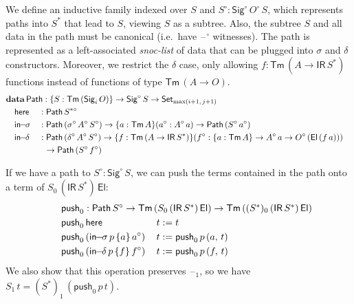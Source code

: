 \documentclass[acmsmall,screen,review,anonymous]{acmart}
\newcommand{\msf}[1]{{\mathsf{#1}}}
\newcommand{\mbf}[1]{{\mathbf{#1}}}
\newcommand{\push}{\mathsf{push}}
\newcommand{\data}{\mbf{data}}
\newcommand{\Set}{\msf{Set}}
\newcommand{\El}{\msf{El}}
\newcommand{\Sig}{\msf{Sig}}
\newcommand{\blank}{{\mathord{\hspace{1pt}\text{--}\hspace{1pt}}}}
\newcommand{\IR}{\msf{IR}}
\newcommand{\Tm}{\msf{Tm}}
\newcommand{\w}{\circ}
\newcommand{\Path}{\msf{Path}}
\newcommand{\here}{\msf{here}}
\newcommand{\Ssw}{S^{*\w}}
\newcommand{\insigma}{\msf{in}\!\!-\!\!\sigma}
\newcommand{\indelta}{\msf{in}\!\!-\!\!\delta}
\begin{document}
\begin{definition}
We define an inductive family indexed
over $S$ and $S^\w : \Sig^\w\,O^\w\,S$, which represents paths into $S^*$ that lead to $S$, viewing
$S$ as a subtree. Also, the subtree $S$ and all data in the path must be canonical (i.e.\ have $\blank^\w$
witnesses). The path is represented as a left-associated \emph{snoc-list} of data that can be
plugged into $\sigma$ and $\delta$ constructors. Moreover, we restrict the $\delta$ case, only
allowing $f : \Tm\,(A \to \IR\,S^*)$ functions instead of functions of type $\Tm\,(A \to O)$.
\begin{alignat*}{4}
  &\rlap{$\data\,\Path : \{S : \Tm\,(\Sig_i\,O)\} \to \Sig^\w\,S \to \Set_{\max(i+1,\,j+1)}$}\\
  &\quad \here    &&: \Path\,\Ssw\\
  &\quad \insigma &&: \Path\,(\sigma^\w\,A^\w\,S^\w) \to \{a : \Tm\,A\}(a^\w : A^\w\,a) \to \Path\,(S^\w\,a^\w) \\
  &\quad \indelta &&: \Path\,(\delta^\w\,A^\w\,S^\w) \to \{f : \Tm\,(A \to \IR\,S^*)\}(f^\w : \{a : \Tm\,A\} \to A^\w\,a \to O^\w\,(\El\,(f\,a)))\\
  &               && \hspace{0.6em} \to \Path\,(S^\w\,f^\w)
\end{alignat*}

If we have a path to $S^\w : \Sig^\w\,S$, we can push the terms contained in the path onto a
term of $S_0\,(\IR\,S^*)\,\El$:
\begin{alignat*}{4}
  & \hspace{-6em}\rlap{$\push_0 : \Path\,S^\w \to \Tm\,(S_0\,(\IR\,S^*)\,\El) \to \Tm\,((S^*)_0\,(\IR\,S^*)\,\El)$}\\
  & \hspace{-6em}\push_0\,\here\,                     &&t := t\\
  & \hspace{-6em}\push_0\,(\insigma\,p\,\{a\}\,a^\w)\,&&t := \push_0\,p\,(a,\,t)\\
  & \hspace{-6em}\push_0\,(\indelta\,p\,\{f\}\,f^\w)\,&&t := \push_0\,p\,(f,\,t)
\end{alignat*}
We also show that this operation preserves $\blank_1$, so we have $S_1\,t = (S^*)_1\,(\push_0\,p\,t)$.
\end{definition}
\end{document}
